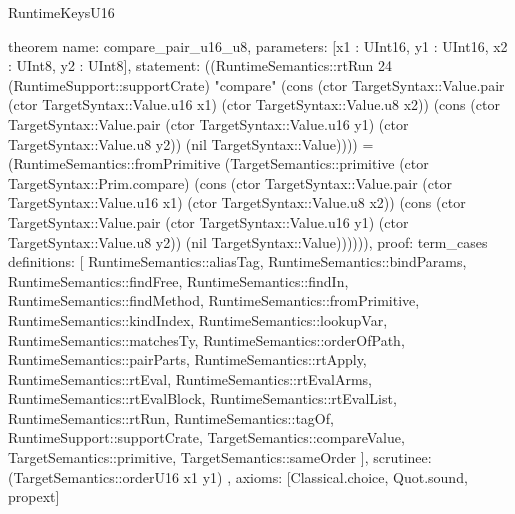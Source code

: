 \begin{lexlean}{RuntimeKeysU16}
\begin{semanticmodule}
theorem{
  name: compare_pair_u16_u8,
  parameters: [x1 : UInt16, y1 : UInt16, x2 : UInt8, y2 : UInt8],
  statement: ((RuntimeSemantics::rtRun 24 (RuntimeSupport::supportCrate) "compare" (cons (ctor TargetSyntax::Value.pair (ctor TargetSyntax::Value.u16 x1) (ctor TargetSyntax::Value.u8 x2)) (cons (ctor TargetSyntax::Value.pair (ctor TargetSyntax::Value.u16 y1) (ctor TargetSyntax::Value.u8 y2)) (nil TargetSyntax::Value)))) = (RuntimeSemantics::fromPrimitive (TargetSemantics::primitive (ctor TargetSyntax::Prim.compare) (cons (ctor TargetSyntax::Value.pair (ctor TargetSyntax::Value.u16 x1) (ctor TargetSyntax::Value.u8 x2)) (cons (ctor TargetSyntax::Value.pair (ctor TargetSyntax::Value.u16 y1) (ctor TargetSyntax::Value.u8 y2)) (nil TargetSyntax::Value)))))),
  proof: term_cases{
    definitions: [
      RuntimeSemantics::aliasTag,
      RuntimeSemantics::bindParams,
      RuntimeSemantics::findFree,
      RuntimeSemantics::findIn,
      RuntimeSemantics::findMethod,
      RuntimeSemantics::fromPrimitive,
      RuntimeSemantics::kindIndex,
      RuntimeSemantics::lookupVar,
      RuntimeSemantics::matchesTy,
      RuntimeSemantics::orderOfPath,
      RuntimeSemantics::pairParts,
      RuntimeSemantics::rtApply,
      RuntimeSemantics::rtEval,
      RuntimeSemantics::rtEvalArms,
      RuntimeSemantics::rtEvalBlock,
      RuntimeSemantics::rtEvalList,
      RuntimeSemantics::rtRun,
      RuntimeSemantics::tagOf,
      RuntimeSupport::supportCrate,
      TargetSemantics::compareValue,
      TargetSemantics::primitive,
      TargetSemantics::sameOrder
    ],
    scrutinee: (TargetSemantics::orderU16 x1 y1)
  },
  axioms: [Classical.choice, Quot.sound, propext]
}


\end{semanticmodule}
\end{lexlean}

